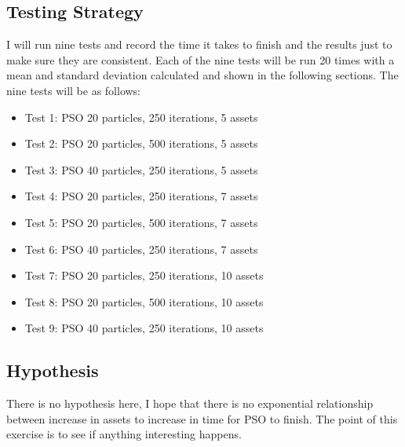     \subsection{Testing Strategy} %
    \label{sub:testing_strategy}
      I will run nine tests and record the time it takes to finish and the results just to make sure they are consistent. Each of the nine tests will be run 20 times with a mean and standard deviation calculated and shown in the following sections. The nine tests will be as follows:
        \begin{itemize}
          \item Test 1: PSO 20 particles, 250 iterations, 5 assets
          \item Test 2: PSO 20 particles, 500 iterations, 5 assets
          \item Test 3: PSO 40 particles, 250 iterations, 5 assets
          \item Test 4: PSO 20 particles, 250 iterations, 7 assets
          \item Test 5: PSO 20 particles, 500 iterations, 7 assets
          \item Test 6: PSO 40 particles, 250 iterations, 7 assets
          \item Test 7: PSO 20 particles, 250 iterations, 10 assets
          \item Test 8: PSO 20 particles, 500 iterations, 10 assets
          \item Test 9: PSO 40 particles, 250 iterations, 10 assets
        \end{itemize}

    \subsection{Hypothesis} %
    \label{sub:hypothesis}
    There is no hypothesis here, I hope that there is no exponential relationship between increase in assets to increase in time for PSO to finish. The point of this exercise is to see if anything interesting happens. 

